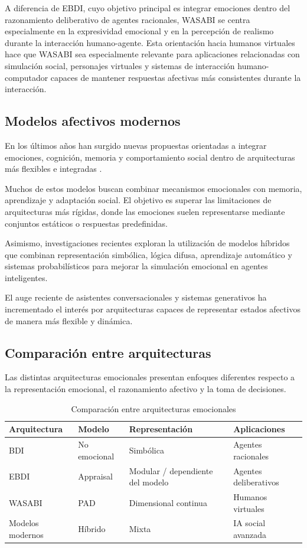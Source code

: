 A diferencia de EBDI, cuyo objetivo principal es integrar emociones dentro del razonamiento deliberativo de agentes racionales, WASABI se centra especialmente en la expresividad emocional y en la percepción de realismo durante la interacción humano-agente. Esta orientación hacia humanos virtuales hace que WASABI sea especialmente relevante para aplicaciones relacionadas con simulación social, personajes virtuales y sistemas de interacción humano-computador capaces de mantener respuestas afectivas más consistentes durante la interacción.

\subsection{Modelos afectivos modernos}

En los últimos años han surgido nuevas propuestas orientadas a integrar emociones, cognición, memoria y comportamiento social dentro de arquitecturas más flexibles e integradas \cite{alfonso2021affect}.

Muchos de estos modelos buscan combinar mecanismos emocionales con memoria, aprendizaje y adaptación social. El objetivo es superar las limitaciones de arquitecturas más rígidas, donde las emociones suelen representarse mediante conjuntos estáticos o respuestas predefinidas.

Asimismo, investigaciones recientes exploran la utilización de modelos híbridos que combinan representación simbólica, lógica difusa, aprendizaje automático y sistemas probabilísticos para mejorar la simulación emocional en agentes inteligentes.

El auge reciente de asistentes conversacionales y sistemas generativos ha incrementado el interés por arquitecturas capaces de representar estados afectivos de manera más flexible y dinámica.

\subsection{Comparación entre arquitecturas}

Las distintas arquitecturas emocionales presentan enfoques diferentes respecto a la representación emocional, el razonamiento afectivo y la toma de decisiones.

\begin{table}[H]
\centering
\caption{Comparación entre arquitecturas emocionales}
\small
\begin{tabular}{|l|l|l|l|}
\hline
\textbf{Arquitectura} & \textbf{Modelo} & \textbf{Representación} & \textbf{Aplicaciones} \\ \hline
BDI & No emocional & Simbólica & Agentes racionales \\ \hline
EBDI & Appraisal & Modular / dependiente del modelo & Agentes deliberativos \\ \hline
WASABI & PAD & Dimensional continua & Humanos virtuales \\ \hline
Modelos modernos & Híbrido & Mixta & IA social avanzada \\ \hline
\end{tabular}
\label{tab:comparacion}
\end{table}

